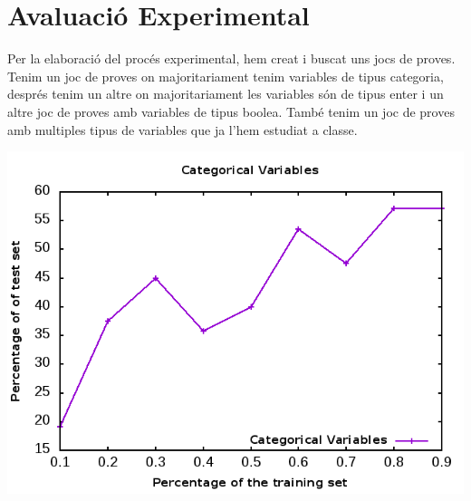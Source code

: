 \documentclass[11pt]{article}
\begin{document}
\section{Avaluació Experimental}
Per la elaboració del procés experimental, hem creat i buscat uns jocs de proves. Tenim un joc de proves on majoritariament tenim variables de tipus categoria, després tenim un altre on majoritariament les variables són de tipus enter i un altre joc de proves amb variables de tipus boolea. També tenim un joc de proves amb multiples tipus de variables que ja l'hem estudiat a classe.
\begin{table}[!h]
\begin{minipage}[b]{0.4\linewidth}
\centering
{}
\caption{Taula per al test de les variables de tipus categoria}
\label{tab:astartable}
\end{minipage}\hfill
\begin{minipage}[b]{0.4\linewidth}
\centering
\includegraphics[width=1.2\linewidth]{Images/bridge.png}
\label{fig:astar}
 \end{minipage}
\end{table}
\end{document}

